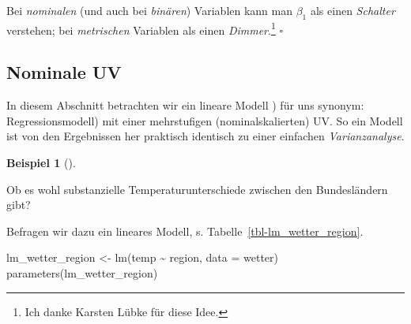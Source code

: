 \documentclass[
  letterpaper,
]{scrbook}
\newenvironment{Shaded}{\begin{snugshade}}{\end{snugshade}}
\newcommand{\AttributeTok}[1]{\textcolor[rgb]{0.40,0.45,0.13}{#1}}
\newcommand{\FunctionTok}[1]{\textcolor[rgb]{0.28,0.35,0.67}{#1}}
\newcommand{\NormalTok}[1]{\textcolor[rgb]{0.00,0.23,0.31}{#1}}
\newcommand{\OtherTok}[1]{\textcolor[rgb]{0.00,0.23,0.31}{#1}}
\newcommand{\SpecialCharTok}[1]{\textcolor[rgb]{0.37,0.37,0.37}{#1}}
\theoremstyle{definition}
\theoremstyle{definition}
\newtheorem{example}{Beispiel}[chapter]
\theoremstyle{definition}
\theoremstyle{remark}
\begin{document}
Bei \emph{nominalen} (und auch bei \emph{binären}) Variablen kann man
\({\beta_1}\) als einen \emph{Schalter} verstehen; bei \emph{metrischen}
Variablen als einen \emph{Dimmer}.\footnote{Ich danke Karsten Lübke für
  diese Idee.} \(\square\)

\subsection{Nominale UV}\label{nominale-uv}

In diesem Abschnitt betrachten wir ein lineare Modell ) für uns synonym:
Regressionsmodell) mit einer mehrstufigen (nominalskalierten) UV. So ein
Modell ist von den Ergebnissen her praktisch identisch zu einer
einfachen \emph{Varianzanalyse}.

\begin{example}[]\protect\hypertarget{exm-wetter2}{}\label{exm-wetter2}

Ob es wohl substanzielle Temperaturunterschiede zwischen den
Bundesländern gibt?

\end{example}

Befragen wir dazu ein lineares Modell, s.
Tabelle~\ref{tbl-lm_wetter_region}.

\begin{Shaded}
\begin{Highlighting}[]
\NormalTok{lm\_wetter\_region }\OtherTok{\textless{}{-}} \FunctionTok{lm}\NormalTok{(temp }\SpecialCharTok{\textasciitilde{}}\NormalTok{ region, }\AttributeTok{data =}\NormalTok{ wetter)}
\FunctionTok{parameters}\NormalTok{(lm\_wetter\_region)}
\end{Highlighting}
\end{Shaded}
\end{document}
